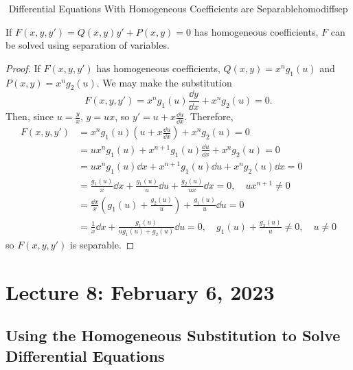     \begin{theorem}{\Stop\,\,Differential Equations With Homogeneous Coefficients are Separable}{homodiffsep}
        
        If \(F(x,y,y')=Q(x,y)y'+P(x,y)=0\) has homogeneous coefficients, \(F\) can be solved using separation of variables.
        \begin{proof}
            If \(F(x,y,y')\) has homogeneous coefficients, \(Q(x,y)=x^ng_1(u)\) and \(P(x,y)=x^ng_2(u)\). We may make the substitution
            \begin{equation*}
                F(x,y,y')=x^ng_1(u)\frac{\dd y}{\dd x}+x^ng_2(u)=0.
            \end{equation*}
            Then, since \(u=\frac{y}{x}\), \(y=ux\), so \(y'=u+x\frac{\dd u}{\dd x}\). Therefore,
            \begin{align*}
                F(x,y,y')&=x^ng_1(u)\left(u+x\frac{\dd u}{\dd x}\right)+x^ng_2(u)=0 \\
                &=ux^ng_1(u)+x^{n+1}g_1(u)\frac{\dd u}{\dd x}+x^ng_2(u)=0 \\
                &=ux^ng_1(u)\dd x+x^{n+1}g_1(u)\dd u+x^ng_2(u)\dd x=0 \\
                &=\frac{g_1(u)}{x}\dd x+\frac{g_1(u)}{u}\dd u+\frac{g_2(u)}{ux}\dd x=0,\quad ux^{n+1}\neq0 \\
                &=\frac{\dd x}{x}\left(g_1(u)+\frac{g_2(u)}{u}\right)+\frac{g_1(u)}{u}\dd u=0 \\
                &=\frac{1}{x}\dd x+\frac{g_1(u)}{ug_1(u)+g_2(u)}\dd u=0, \quad g_1(u)+\frac{g_2(u)}{u}\neq0,\quad u\neq0
            \end{align*}
            so \(F(x,y,y')\) is separable.
        \end{proof}

    \end{theorem}

    \pagebreak

\section{Lecture 8: February 6, 2023}

    \subsection{Using the Homogeneous Substitution to Solve Differential Equations}

